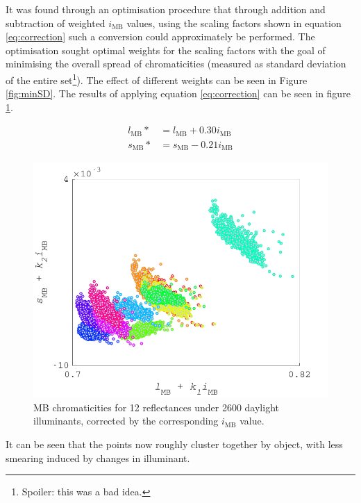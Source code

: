 It was found through an optimisation procedure that through addition and subtraction of weighted $i_{\text{MB}}$ values, using the scaling factors shown in equation \ref{eq:correction} such a conversion could approximately be performed. The optimisation sought optimal weights for the scaling factors with the goal of minimising the overall spread of chromaticities (measured as standard deviation of the entire set\footnote{Spoiler: this was a bad idea.}). The effect of different weights can be seen in Figure \ref{fig:minSD}. The results of applying equation \ref{eq:correction} can be seen in figure \ref{fig:corrected}.

\begin{subequations} \label{eq:correction}
\begin{align}
l_{\text{MB}}* &= l_{\text{MB}} + 0.30i_{\text{MB}}\\ %
s_{\text{MB}}* &= s_{\text{MB}} - 0.21i_{\text{MB}}
\end{align}
\end{subequations}

\begin{figure}[htbp]
    \includegraphics[max width=\textwidth]{figs/comp/melcomp_1/correctedChromaticities.pdf}
    \caption{\gls{MB} chromaticities for 12 reflectances under 2600 daylight illuminants, corrected by the corresponding $i_{\text{MB}}$ value.}
    \label{fig:corrected}
\end{figure} 

It can be seen that the points now roughly cluster together by object, with less smearing induced by changes in illuminant.

